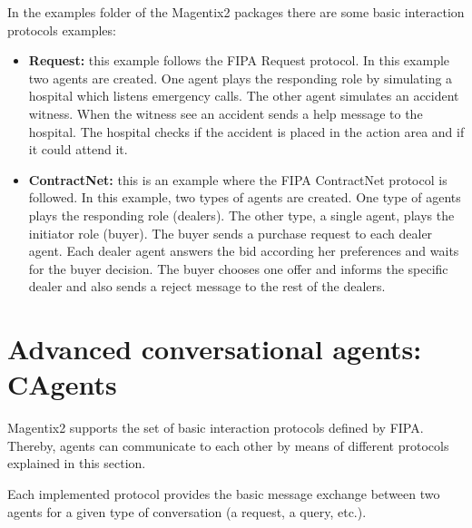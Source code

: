 In the examples folder of the Magentix2 packages there are some basic interaction protocols examples:
\begin{itemize}

\item \textbf{Request:} this example follows the FIPA Request protocol. In this example two agents are created. One agent plays the responding role by simulating a hospital which listens emergency calls. The other agent simulates an accident witness. When the witness see an accident sends a help message to the hospital. The hospital checks if the accident is placed in the action area and if it could attend it.

\item \textbf{ContractNet:} this is an example where the FIPA ContractNet protocol is followed. In this example, two types of agents are created. One type of agents plays the responding role (dealers). The other type, a single agent, plays the initiator role (buyer). The buyer sends a purchase request to each dealer agent. Each dealer agent answers the bid according her preferences and waits for the buyer decision. The buyer chooses one offer and informs the specific dealer and also sends a reject message to the rest of the dealers.
\end{itemize}

\chapter{Advanced conversational agents: CAgents}\label{sec:CAgents}

Magentix2  supports the set of basic interaction protocols defined by FIPA. Thereby, agents can communicate to each other by means of different protocols explained in this section.

Each implemented protocol provides the basic message exchange between two agents for a given type of conversation (a request, a query, etc.). %



